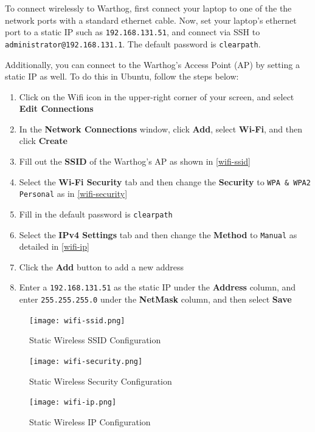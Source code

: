 \documentclass[]{clearpath-latex/clearpath-manual}
\begin{document}
To connect wirelessly to Warthog, first connect your laptop to one of the the network ports with a standard ethernet cable. Now, set your laptop’s ethernet port to a static IP such as \lstinline{192.168.131.51}, and connect via SSH to \lstinline{administrator@192.168.131.1}. The default password is \lstinline{clearpath}.

Additionally, you can connect to the Warthog's Access Point (AP) by setting a static IP as well. To do this in Ubuntu, follow the steps below:

\begin{enumerate}
  \item Click on the Wifi icon in the upper-right corner of your screen, and select \textbf{Edit Connections}
  \item In the \textbf{Network Connections} window, click \textbf{Add}, select \textbf{Wi-Fi},  and then click \textbf{Create}
  \item Fill out the \textbf{SSID} of the Warthog's AP as shown in \autoref{wifi-ssid}
  \item Select the \textbf{Wi-Fi Security} tab and then change the \textbf{Security} to \lstinline{WPA & WPA2 Personal} as in  \autoref{wifi-security}
  \item Fill in the default password is \lstinline{clearpath}
  \item Select the \textbf{IPv4 Settings} tab and then change the \textbf{Method} to \lstinline{Manual} as detailed in \autoref{wifi-ip}
  \item Click the \textbf{Add} button to add a new address
  \item Enter a \lstinline{192.168.131.51} as the static IP under the \textbf{Address} column, and enter \lstinline{255.255.255.0} under the \textbf{NetMask} column, and then select \textbf{Save}
\end{enumerate}

\begin{figure}[!h]
  \centering
  \texttt{[image: wifi-ssid.png]}
  \caption{Static Wireless SSID Configuration}
  \label{wifi-ssid}
\end{figure}

\begin{figure}[!h]
  \centering
  \texttt{[image: wifi-security.png]}
  \caption{Static Wireless Security Configuration}
  \label{wifi-security}
\end{figure}

\begin{figure}[!h]
  \centering
  \texttt{[image: wifi-ip.png]}
  \caption{Static Wireless IP Configuration}
  \label{wifi-ip}
\end{figure}
\end{document}
